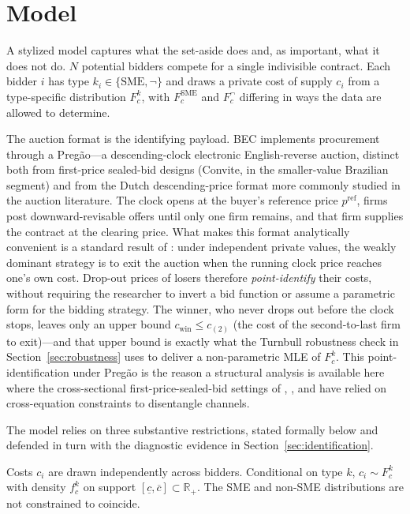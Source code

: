 \section{Model}\label{sec:model}

A stylized model captures what the set-aside does and, as important, what it does not do. $N$ potential bidders compete for a single indivisible contract. Each bidder $i$ has type $k_i \in \{\text{SME}, \neg\}$ and draws a private cost of supply $c_i$ from a type-specific distribution $F_c^k$, with $F_c^{\text{SME}}$ and $F_c^{\neg}$ differing in ways the data are allowed to determine.

The auction format is the identifying payload. BEC implements procurement through a Preg\~ao---a descending-clock electronic English-reverse auction, distinct both from first-price sealed-bid designs (Convite, in the smaller-value Brazilian segment) and from the Dutch descending-price format more commonly studied in the auction literature. The clock opens at the buyer's reference price $p^{\mathrm{ref}}$, firms post downward-revisable offers until only one firm remains, and that firm supplies the contract at the clearing price. What makes this format analytically convenient is a standard result of \citet{haile2003}: under independent private values, the weakly dominant strategy is to exit the auction when the running clock price reaches one's own cost. Drop-out prices of losers therefore \emph{point-identify} their costs, without requiring the researcher to invert a bid function or assume a parametric form for the bidding strategy. The winner, who never drops out before the clock stops, leaves only an upper bound $c_{\text{win}} \le c_{(2)}$ (the cost of the second-to-last firm to exit)---and that upper bound is exactly what the Turnbull robustness check in Section~\ref{sec:robustness} uses to deliver a non-parametric MLE of $F_c^k$. This point-identification under Preg\~ao is the reason a structural analysis is available here where the cross-sectional first-price-sealed-bid settings of \citet{marion2007}, \citet{krasnokutskaya2011}, and \citet{atheyseira2011} have relied on cross-equation constraints to disentangle channels.

The model relies on three substantive restrictions, stated formally below and defended in turn with the diagnostic evidence in Section~\ref{sec:identification}.

\begin{assumption}\label{a:ipv}
Costs $c_i$ are drawn independently across bidders. Conditional on type $k$, $c_i \sim F_c^k$ with density $f_c^k$ on support $[\underline{c}, \overline{c}] \subset \mathbb{R}_+$. The SME and non-SME distributions are not constrained to coincide.
\end{assumption}

